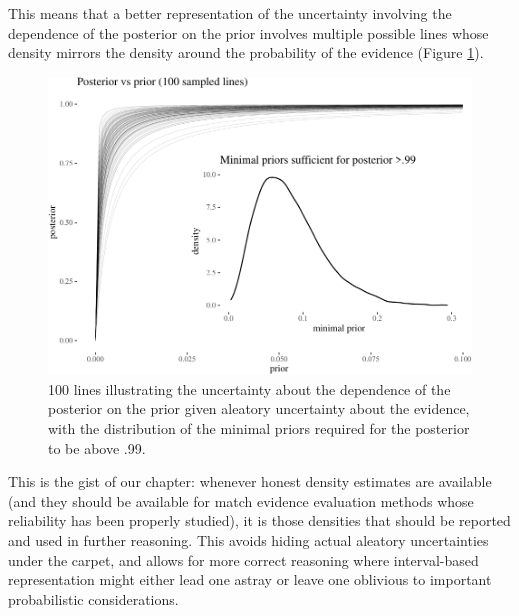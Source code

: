 \documentclass[
  10pt,
  dvipsnames,enabledeprecatedfontcommands]{scrartcl}
\begin{document}
This means that a better representation of the uncertainty involving the
dependence of the posterior on the prior involves multiple possible
lines whose density mirrors the density around the probability of the
evidence (Figure \ref{fig:lines}).

\begin{figure}[H]


\begin{center}\includegraphics[width=0.8\linewidth]{chapter-outline_files/figure-latex/fig:lines3-1} \end{center}

\caption{100 lines illustrating the uncertainty about the dependence of the posterior on the prior given aleatory uncertainty about the evidence, with the distribution of the minimal priors required for the posterior to be above .99.}

\label{fig:lines}

\end{figure}


This is the gist of our chapter: whenever honest density estimates are
available (and they should be available for match evidence evaluation
methods whose reliability has been properly studied), it is those
densities that should be reported and used in further reasoning. This
avoids hiding actual aleatory uncertainties under the carpet, and allows
for more correct reasoning where interval-based representation might
either lead one astray or leave one oblivious to important probabilistic
considerations.
\end{document}
